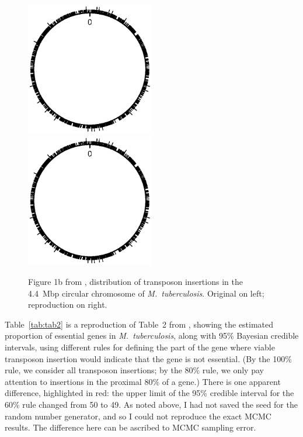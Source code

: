 \begin{figure}
\includegraphics[viewport=179 299 438 517, width=0.50\textwidth]{../talk/Figs/circlefig.ps}
\hfill
\includegraphics[viewport=179 299 438 517, width=0.50\textwidth]{../reproduction/Figs/circlefig.ps}

\caption{Figure 1b from \citet{lamichhane2003}, distribution of
transposon insertions in the 4.4~Mbp circular chromosome of \emph{M.\
tuberculosis}. Original on left; reproduction on
right.\label{fig:fig1b}}
\end{figure}

Table~\ref{tab:tab2} is a reproduction of Table~2
from \citet{lamichhane2003}, showing the estimated proportion of
essential genes in \emph{M.\ tuberculosis}, along with 95\% Bayesian
credible intervals, using different rules for
defining the part of the gene where viable transposon insertion would
indicate that the gene is not essential. (By the 100\% rule, we
consider all transposon insertions; by the 80\% rule, we only pay
attention to insertions in the proximal 80\% of a gene.)
There is one apparent difference, highlighted in red: the upper
limit of the 95\% credible interval for the 60\% rule changed from 50
to 49. As noted above, I had not saved the seed for the random number
generator, and so I could not reproduce the exact MCMC results. The
difference here can be ascribed to MCMC sampling error.

